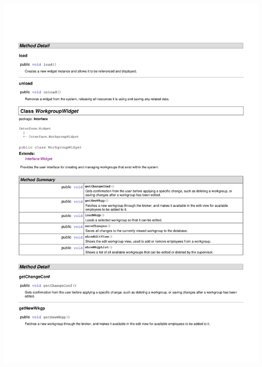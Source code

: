 \documentclass[letterpaper,12pt]{report}
\begin{document}
\includegraphics[scale=0.9,trim=20mm 30mm 25mm 25mm]{externals/InterfaceDataDictionary11.pdf}
\newpage
\end{document}
